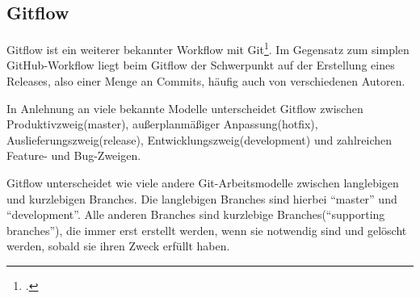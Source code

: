\subsection{Gitflow}

Gitflow ist ein weiterer bekannter Workflow mit Git\footcite{nvie-git-branch-model}. Im Gegensatz zum simplen GitHub-Workflow liegt beim Gitflow der Schwerpunkt auf der Erstellung eines Releases, also einer Menge an Commits, häufig auch von verschiedenen Autoren.

In Anlehnung an viele bekannte Modelle unterscheidet Gitflow zwischen Produktivzweig(master), außerplanmäßiger Anpassung(hotfix), Auslieferungszweig(release), Entwicklungszweig(development) und zahlreichen Feature- und Bug-Zweigen.

Gitflow unterscheidet wie viele andere Git-Arbeitsmodelle zwischen langlebigen und kurzlebigen Branches. Die langlebigen Branches sind hierbei ``master'' und ``development''. Alle anderen Branches sind kurzlebige Branches(``supporting branches''), die immer erst erstellt werden, wenn sie notwendig sind und gelöscht werden, sobald sie ihren Zweck erfüllt haben.

